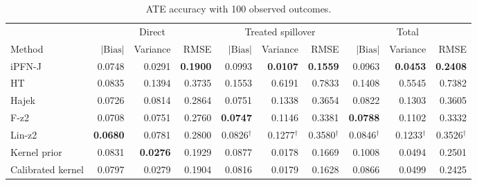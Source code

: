 \begin{table}[tb]
\centering
\caption{ATE accuracy with 100 observed outcomes.}
\begingroup\footnotesize
\setlength{\tabcolsep}{3pt}
\begin{tabular*}{\linewidth}{@{\extracolsep{\fill}}l*{9}{r}@{}}
\toprule
&\multicolumn{3}{c}{Direct}&\multicolumn{3}{c}{Treated spillover}&\multicolumn{3}{c}{Total}\\
\cmidrule(lr){2-4}\cmidrule(lr){5-7}\cmidrule(lr){8-10}
Method&$|\mathrm{Bias}|$&Variance&RMSE&$|\mathrm{Bias}|$&Variance&RMSE&$|\mathrm{Bias}|$&Variance&RMSE\\
\midrule
iPFN-J & \cellcolor{blue!7}0.0748 & \cellcolor{blue!11}0.0291 & \cellcolor{blue!24}\textbf{0.1900} & \cellcolor{blue!4}0.0993 & \cellcolor{blue!24}\textbf{0.0107} & \cellcolor{blue!24}\textbf{0.1559} & \cellcolor{blue!7}0.0963 & \cellcolor{blue!24}\textbf{0.0453} & \cellcolor{blue!24}\textbf{0.2408} \\
HT & \cellcolor{blue!1}0.0835 & \cellcolor{blue!1}0.1394 & \cellcolor{blue!1}0.3735 & \cellcolor{blue!2}0.1553 & \cellcolor{blue!2}0.6191 & \cellcolor{blue!2}0.7833 & \cellcolor{blue!2}0.1408 & \cellcolor{blue!2}0.5545 & \cellcolor{blue!2}0.7382 \\
Hajek & \cellcolor{blue!11}0.0726 & \cellcolor{blue!2}0.0814 & \cellcolor{blue!2}0.2864 & \cellcolor{blue!17}0.0751 & \cellcolor{blue!4}0.1338 & \cellcolor{blue!4}0.3654 & \cellcolor{blue!17}0.0822 & \cellcolor{blue!4}0.1303 & \cellcolor{blue!4}0.3605 \\
F-z2 & \cellcolor{blue!17}0.0708 & \cellcolor{blue!7}0.0751 & \cellcolor{blue!7}0.2760 & \cellcolor{blue!24}\textbf{0.0747} & \cellcolor{blue!7}0.1146 & \cellcolor{blue!7}0.3381 & \cellcolor{blue!24}\textbf{0.0788} & \cellcolor{blue!7}0.1102 & \cellcolor{blue!7}0.3332 \\
Lin-z2 & \cellcolor{blue!24}\textbf{0.0680} & \cellcolor{blue!4}0.0781 & \cellcolor{blue!4}0.2800 & 0.0826$^{\dagger}$ & 0.1277$^{\dagger}$ & 0.3580$^{\dagger}$ & 0.0846$^{\dagger}$ & 0.1233$^{\dagger}$ & 0.3526$^{\dagger}$ \\
Kernel prior & \cellcolor{blue!2}0.0831 & \cellcolor{blue!24}\textbf{0.0276} & \cellcolor{blue!11}0.1929 & \cellcolor{blue!7}0.0877 & \cellcolor{blue!17}0.0178 & \cellcolor{blue!11}0.1669 & \cellcolor{blue!4}0.1008 & \cellcolor{blue!17}0.0494 & \cellcolor{blue!11}0.2501 \\
Calibrated kernel & \cellcolor{blue!4}0.0797 & \cellcolor{blue!17}0.0279 & \cellcolor{blue!17}0.1904 & \cellcolor{blue!11}0.0816 & \cellcolor{blue!11}0.0179 & \cellcolor{blue!17}0.1628 & \cellcolor{blue!11}0.0866 & \cellcolor{blue!11}0.0499 & \cellcolor{blue!17}0.2425 \\

\end{tabular*}
\end{table}
